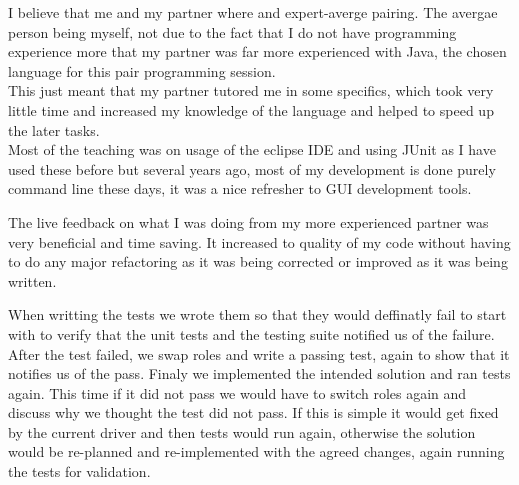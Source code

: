 \documentclass[11pt]{article}
\begin{document}
I believe that me and my partner where and expert-averge pairing.  The avergae person being myself, not due to the fact that I do not have programming experience more that my partner was far more experienced with Java, the chosen language for this pair programming session.
\\This just meant that my partner tutored me in some specifics, which took very little time and increased my knowledge of the language and helped to speed up the later tasks.
\\Most of the teaching was on usage of the eclipse IDE and using JUnit as I have used these before but several years ago, most of my development is done purely command line these days, it was a nice refresher to GUI development tools.

The live feedback on what I was doing from my more experienced partner was very beneficial and time saving.  It increased to quality of my code without having to do any major refactoring as it was being corrected or improved as it was being written.
\newline

When writting the tests we wrote them so that they would deffinatly fail to start with to verify that the unit tests and the testing suite notified us of the failure.  After the test failed, we swap roles and write a passing test, again to show that it notifies us of the pass.  Finaly we implemented the intended solution and ran tests again.  This time if it did not pass we would have to switch roles again and discuss why we thought the test did not pass.  If this is simple it would get fixed by the current driver and then tests would run again, otherwise the solution would be re-planned and re-implemented with the agreed changes, again running the tests for validation.
\end{document}
